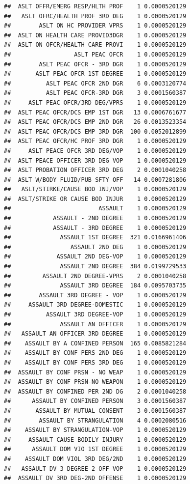 \documentclass[]{book}
\begin{document}
\begin{verbatim}
##  ASLT OFFR/EMERG RESP/HLTH PROF    1 0.0000520129
##   ASLT OFRC/HEALTH PROF 3RD DEG    1 0.0000520129
##        ASLT ON HC PROVIDER VPRS    1 0.0000520129
##  ASLT ON HEALTH CARE PROVID3DGR    1 0.0000520129
##  ASLT ON OFCR/HEALTH CARE PROVI    1 0.0000520129
##                  ASLT PEAC OFCR    1 0.0000520129
##        ASLT PEAC OFCR - 3RD DGR    1 0.0000520129
##       ASLT PEAC OFCR 1ST DEGREE    1 0.0000520129
##          ASLT PEAC OFCR 2ND DGR    6 0.0003120774
##          ASLT PEAC OFCR-3RD DGR    3 0.0001560387
##     ASLT PEAC OFCR/3RD DEG/VPRS    1 0.0000520129
##  ASLT PEAC OFCR/DCS EMP 1ST DGR   13 0.0006761677
##  ASLT PEAC OFCR/DCS EMP 2ND DGR   26 0.0013523354
##  ASLT PEAC OFCR/DCS EMP 3RD DGR  100 0.0052012899
##  ASLT PEAC OFCR/HC PROF 3RD DGR    1 0.0000520129
##     ASLT PEACE OFCR 3RD DEG/VOP    1 0.0000520129
##  ASLT PEACE OFFICER 3RD DEG VOP    1 0.0000520129
##  ASLT PROBATION OFFICER 3RD DEG    2 0.0001040258
##  ASLT W/BODY FLUID/PUB SFTY OFF   14 0.0007281806
##   ASLT/STIRKE/CAUSE BOD INJ/VOP    1 0.0000520129
##  ASLT/STRIKE OR CAUSE BOD INJUR    1 0.0000520129
##                         ASSAULT    1 0.0000520129
##            ASSAULT - 2ND DEGREE    1 0.0000520129
##            ASSAULT - 3RD DEGREE    1 0.0000520129
##              ASSAULT 1ST DEGREE  321 0.0166961406
##                 ASSAULT 2ND DEG    1 0.0000520129
##             ASSAULT 2ND DEG-VOP    1 0.0000520129
##              ASSAULT 2ND DEGREE  384 0.0199729533
##         ASSAULT 2ND DEGREE-VPRS    2 0.0001040258
##              ASSAULT 3RD DEGREE  184 0.0095703735
##        ASSAULT 3RD DEGREE - VOP    1 0.0000520129
##     ASSAULT 3RD DEGREE-DOMESTIC    1 0.0000520129
##          ASSAULT 3RD DEGREE-VOP    1 0.0000520129
##              ASSAULT AN OFFICER    1 0.0000520129
##   ASSAULT AN OFFICER 3RD DEGREE    1 0.0000520129
##    ASSAULT BY A CONFINED PERSON  165 0.0085821284
##    ASSAULT BY CONF PERS 2ND DEG    1 0.0000520129
##    ASSAULT BY CONF PERS 3RD DEG    1 0.0000520129
##  ASSAULT BY CONF PRSN - NO WEAP    1 0.0000520129
##  ASSAULT BY CONF PRSN-NO WEAPON    1 0.0000520129
##  ASSAULT BY CONFINED PER 2ND DG    2 0.0001040258
##      ASSAULT BY CONFINED PERSON    3 0.0001560387
##       ASSAULT BY MUTUAL CONSENT    3 0.0001560387
##        ASSAULT BY STRANGULATION    4 0.0002080516
##    ASSAULT BY STRANGULATION-VOP    1 0.0000520129
##     ASSAULT CAUSE BODILY INJURY    1 0.0000520129
##      ASSAULT DOM VIO 1ST DEGREE    1 0.0000520129
##    ASSAULT DOM VIOL 3RD DEG/2ND    1 0.0000520129
##   ASSAULT DV 3 DEGREE 2 OFF VOP    1 0.0000520129
##  ASSAULT DV 3RD DEG-2ND OFFENSE    1 0.0000520129

\end{verbatim}
\end{document}
